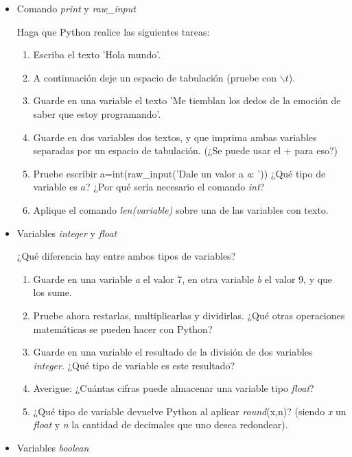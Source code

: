 \documentclass[a4paper]{article}
\begin{document}
\begin{itemize}

\item Comando \textit{print} y \textit{raw\_input}

Haga que Python realice las siguientes tareas:

\begin{enumerate}
 \item Escriba el texto 'Hola mundo'.
 \item A continuación deje un espacio de tabulación (pruebe con $\backslash t$).

 \item Guarde en una variable el texto 'Me tiemblan los dedos de la emoción de saber que estoy programando'.
 \item Guarde en dos variables dos textos, y que imprima ambas variables separadas por un espacio de tabulación. (¿Se puede usar el + para eso?)
 \item Pruebe escribir a=int(raw\_input('Dale un valor a \textit{a}: ')) ¿Qué tipo de variable es $a$? ¿Por qué sería necesario el comando \textit{int}?
 \item Aplique el comando \textit{len(variable)} sobre una de las variables con texto.
\end{enumerate}


\item Variables \textit{integer} y \textit{float}

¿Qué diferencia hay entre ambos tipos de variables?

\begin{enumerate}
 \item Guarde en una variable \textit{a} el valor 7, en otra variable \textit{b} el valor 9, y que los sume.
 \item Pruebe ahora restarlas, multiplicarlas y dividirlas. ¿Qué otras operaciones matemáticas se pueden hacer con Python?
 \item Guarde en una variable el resultado de la división de dos variables \textit{integer}. ¿Qué tipo de variable es este resultado?
 \item Averigue: ¿Cuántas cifras puede almacenar una variable tipo \textit{float}?
 \item ¿Qué tipo de variable devuelve Python al aplicar \textit{round}(x,n)? (siendo \textit{x} un \textit{float} y \textit{n} la cantidad de decimales que uno desea redondear).
\end{enumerate}


\item Variables \textit{boolean}


\end{itemize}
\end{document}

